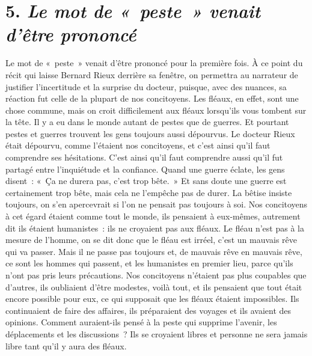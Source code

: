 \documentclass[french,twoside]{book} %
\begin{document}
\section[{5. Le mot de « peste » venait d’être prononcé}]{5. \emph{Le mot de « peste » venait d’être prononcé}}
\noindent Le mot de « peste » venait d’être prononcé pour la première fois. À ce point du récit qui laisse Bernard Rieux derrière sa fenêtre, on permettra au narrateur de justifier l’incertitude et la surprise du docteur, puisque, avec des nuances, sa réaction fut celle de la plupart de nos concitoyens. Les fléaux, en effet, sont une chose commune, mais on croit difficilement aux fléaux lorsqu’ils vous tombent sur la tête. Il y a eu dans le monde autant de pestes que de guerres. Et pourtant pestes et guerres trouvent les gens toujours aussi dépourvus. Le docteur Rieux était dépourvu, comme l’étaient nos concitoyens, et c’est ainsi qu’il faut comprendre ses hésitations. C’est ainsi qu’il faut comprendre aussi qu’il fut partagé entre l’inquiétude et la confiance. Quand une guerre éclate, les gens disent : « Ça ne durera pas, c’est trop bête. » Et sans doute une guerre est certainement trop bête, mais cela ne l’empêche pas de durer. La bêtise insiste toujours, on s’en apercevrait si l’on ne pensait pas toujours à soi. Nos concitoyens à cet égard étaient comme tout le monde, ils pensaient à eux-mêmes, autrement dit ils étaient humanistes : ils ne croyaient pas aux fléaux. Le fléau n’est pas à la mesure de l’homme, on se dit donc que le fléau est irréel, c’est un mauvais rêve qui va passer. Mais il ne passe pas toujours et, de mauvais rêve en mauvais rêve, ce sont les hommes qui passent, et les humanistes en premier lieu, parce qu’ils n’ont pas pris leurs précautions. Nos concitoyens n’étaient pas plus coupables que d’autres, ils oubliaient d’être modestes, voilà tout, et ils pensaient que tout était encore possible pour eux, ce qui supposait que les fléaux étaient impossibles. Ils continuaient de faire des affaires, ils préparaient des voyages et ils avaient des opinions. Comment auraient-ils pensé à la peste qui supprime l’avenir, les déplacements et les discussions ? Ils se croyaient libres et personne ne sera jamais libre tant qu’il y aura des fléaux.\par
\end{document}
